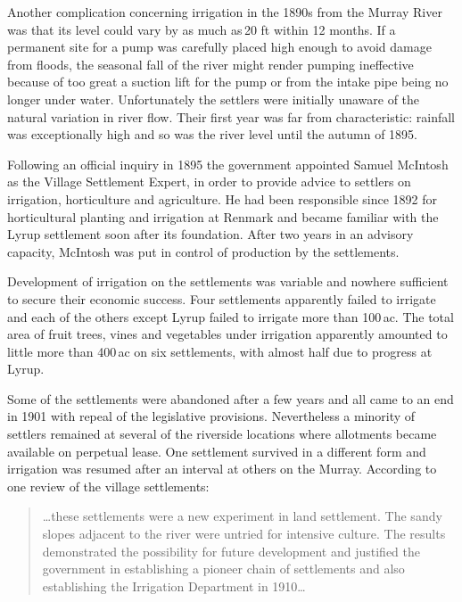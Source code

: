 Another complication concerning irrigation in the 1890s from the
Murray River was that its level could vary by as much as\,20 ft within
12 months.  If a permanent site for a pump was carefully placed high
enough to avoid damage from floods, the seasonal fall of the river
might render pumping ineffective because of too great a suction lift
for the pump or from the intake pipe being no longer under water.
Unfortunately the settlers were initially unaware of the natural
variation in river flow.  Their first year was far from
characteristic: rainfall was exceptionally high and so was the river
level until the autumn of 1895.

Following an official inquiry in 1895 the government appointed Samuel
McIntosh as the Village Settlement Expert, in order to provide advice
to settlers on irrigation, horticulture and agriculture.  He had been responsible since 1892 for horticultural
planting and irrigation at Renmark and became familiar with the Lyrup
settlement soon after its foundation.  After two years in an advisory
capacity, McIntosh was put in control of production by the
settlements.

Development of irrigation on the settlements was variable and nowhere
sufficient to secure their economic success.  Four settlements
apparently failed to irrigate and each of the others except Lyrup
failed to irrigate more than 100\,ac. The total area of fruit trees,
vines and vegetables under irrigation apparently amounted to little
more than 400\,ac on six settlements, with almost half due to progress
at Lyrup.

Some of the settlements were abandoned after a few years and all came
to an end in 1901 with repeal of the legislative provisions.
Nevertheless a minority of settlers remained at several of the
riverside locations where allotments became available on perpetual
lease.  One settlement survived in a different form and irrigation was
resumed after an interval at others on the Murray.  According to one
review of the village settlements:
\begin{quote}
	\ldots these settlements were a new experiment in land
	settlement.  The sandy slopes adjacent to the river were
	untried for intensive culture.  The results demonstrated the
	possibility for future development and justified the
	government in establishing a pioneer chain of settlements and
	also establishing the Irrigation Department in
	1910\ldots{}
\end{quote}

